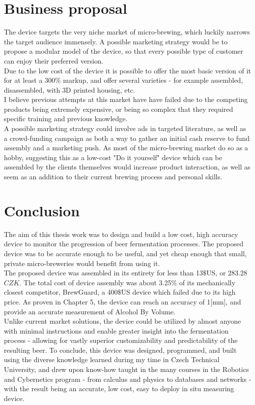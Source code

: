 \documentclass[twoside]{ctuthesis}
\theoremstyle{plain}
\theoremstyle{definition}
\theoremstyle{note}
\begin{document}
\section{Business proposal}
The device targets the very niche market of micro-brewing, which luckily narrows the target audience immensely. A possible marketing strategy would be to propose a modular model of the device, so that every possible type of customer can enjoy their preferred version.\\
Due to the low cost of the device it is possible to offer the most basic version of it for at least a 300$\%$ markup, and offer several varieties - for example assembled, disassembled, with 3D printed housing, etc.\\
I believe previous attempts at this market have have failed due to the competing products being extremely expensive, or being so complex that they required specific training and previous knowledge.\\
A possible marketing strategy could involve ads in targeted literature, as well as a crowd-funding campaign as both a way to gather an initial cash reserve to fund assembly and a marketing push. As most of the micro-brewing market do so as a hobby, suggesting this as a low-cost "Do it yourself" device which can be assembled by the clients themselves would increase product interaction, as well as seem as an addition to their current brewing process and personal skills.

\section{Conclusion}
The aim of this thesis work was to design and build a low cost, high accuracy device to monitor the progression of beer fermentation processes. The proposed device was to be accurate enough to be useful, and yet cheap enough that small, private micro-breweries would benefit from using it.\\ 
The proposed device was assembled in its entirety for less than 13$\$$US, or 283.28 $CZK$. The total cost of device assembly was about 3.25$\%$ of its mechanically closest competitor, BrewGuard, a 400$\$$US device which failed due to its high price. As proven in Chapter 5, the device can reach an accuracy of 1[mm], and provide an accurate measurement of Alcohol By Volume.\\
Unlike current market solutions, the device could be utilized by almost anyone with minimal instructions and enable greater insight into the fermentation process - allowing for vastly superior customizability and predictability of the resulting beer.
To conclude, this device was designed, programmed, and built using the diverse knowledge learned during my time in Czech Technical University, and drew upon know-how taught in the many courses in the Robotics and Cybernetics program - from calculus and physics to databases and networks - with the result being an accurate, low cost, easy to deploy in situ measuring device.
\end{document}
